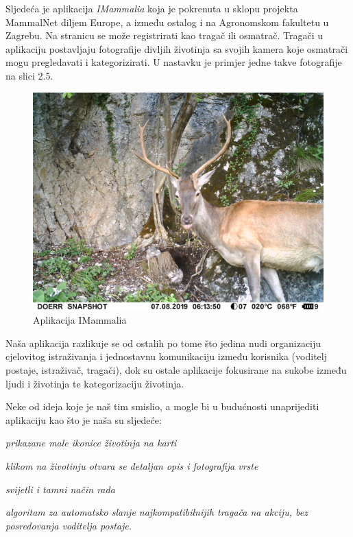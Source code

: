 		Sljedeća je aplikacija \textit{IMammalia} koja je pokrenuta u sklopu projekta MammalNet diljem Europe, a između ostalog i na Agronomskom fakultetu u Zagrebu. Na stranicu se može registrirati kao tragač ili osmatrač. Tragači u aplikaciju postavljaju fotografije divljih životinja sa svojih kamera koje osmatrači mogu pregledavati i kategorizirati. U nastavku je primjer jedne takve fotografije na slici 2.5.
		
		\begin{figure}[H]
			\includegraphics[scale=0.75]{slike/primjera3.JPG} %
			\centering
			\caption{Aplikacija IMammalia}
			\label{fig:mammal} %
		\end{figure}
		
		Naša aplikacija razlikuje se od ostalih po tome što jedina nudi organizaciju cjelovitog istraživanja i jednostavnu komunikaciju između korisnika (voditelj postaje, istraživač, tragači), dok su ostale aplikacije fokusirane na sukobe između ljudi i životinja te kategorizaciju životinja.
		
		Neke od ideja koje je naš tim smislio, a mogle bi u budućnosti unaprijediti aplikaciju kao što je naša su sljedeće:
		\begin{packed_item}
			\item \textit{prikazane male ikonice životinja na karti}
			\item \textit{klikom na životinju otvara se detaljan opis i fotografija vrste}
			\item \textit{svijetli i tamni način rada}
			\item \textit{algoritam za automatsko slanje najkompatibilnijih tragača na akciju, bez posredovanja voditelja postaje.}
		\end{packed_item}
		
		
		
	
